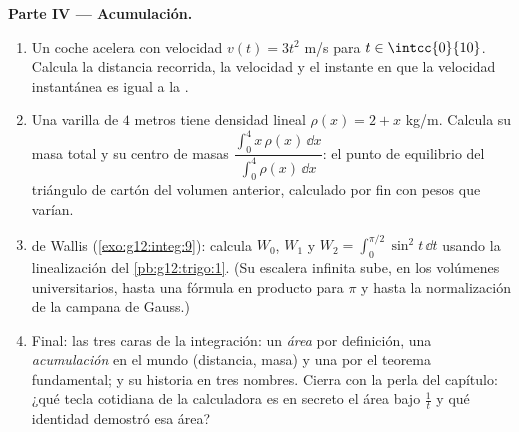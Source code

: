 \begin{problem}
\medskip
\noindent\textbf{Parte IV --- Acumulación.}
\begin{enumerate}[resume]
  \item Un coche acelera con velocidad $v(t) = 3t^2$ m/s para
        $t \in \intcc{0}{10}$. Calcula la distancia recorrida, la velocidad
         y el instante en que la velocidad instantánea es igual a la
        .
  \item Una varilla de $4$ metros tiene densidad lineal
        $\rho(x) = 2 + x$ kg/m. Calcula su masa total y su centro de masas
        $\dfrac{\int_0^4 x\,\rho(x)\,\dd x}{\int_0^4 \rho(x)\,\dd x}$: el
        punto de equilibrio del triángulo de cartón del volumen anterior,
        calculado por fin con pesos que varían.
  \item {} de Wallis (\cref{exo:g12:integ:9}): calcula $W_0$, $W_1$
        y $W_2 = \int_0^{\pi/2} \sin^2 t\,\dd t$ usando la linealización
        del \cref{pb:g12:trigo:1}. (Su escalera infinita sube, en los
        volúmenes universitarios, hasta una fórmula en producto para $\pi$
        y hasta la normalización de la campana de Gauss.)
  \item Final: las tres caras de la integración: un \emph{área} por
        definición, una \emph{acumulación} en el mundo (distancia, masa) y
        una \emph{} por el teorema fundamental; y su historia en
        tres nombres. Cierra con la perla del capítulo: ¿qué tecla
        cotidiana de la calculadora es en secreto el área bajo $\frac1t$ y
        qué identidad demostró esa área?
\end{enumerate}
\end{problem}
